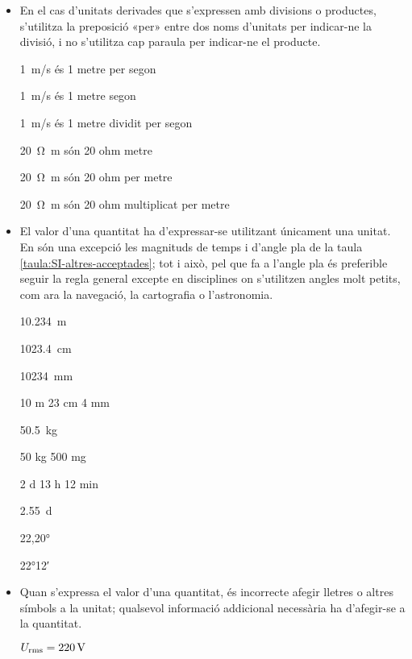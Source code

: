 \begin{itemize}
\item En el cas  d'unitats derivades que s'expressen amb divisions o
productes, s'utilitza la preposició «per» entre dos noms d'unitats
per indicar-ne la divisió, i no s'utilitza cap paraula per indicar-ne el
producte.

\textcolor{Green}\faCheckSquare{} \qty{1}{m/s} és 1 metre per segon

\textcolor{Red}\faTimesCircle{}  \qty{1}{m/s} és 1 metre segon

\textcolor{Red}\faTimesCircle{}  \qty{1}{m/s} és 1 metre dividit per segon

 \textcolor{Green}\faCheckSquare{} \qty{20}{\ohm.m} són 20 ohm metre

\textcolor{Red}\faTimesCircle{}   \qty{20}{\ohm.m} són 20 ohm  per metre

\textcolor{Red}\faTimesCircle{}   \qty{20}{\ohm.m} són 20 ohm multiplicat per metre


\item El valor d'una quantitat ha d'expressar-se  utilitzant únicament una unitat. En són una excepció les magnituds de temps i d'angle pla de la taula \vref{taula:SI-altres-acceptades}; tot i això, pel que fa a l'angle pla és preferible seguir la regla general excepte en disciplines on s'utilitzen angles molt petits, com ara la navegació, la cartografia o l'astronomia.

\textcolor{Green}\faCheckSquare{} \qty{10,234}{m}

\textcolor{Green}\faCheckSquare{} \qty{1023,4}{cm}

\textcolor{Green}\faCheckSquare{} \qty{10234}{mm}

\textcolor{Red}\faTimesCircle{}  10 m 23 cm 4 mm

\textcolor{Green}\faCheckSquare{} \qty{50,5}{kg}


\textcolor{Red}\faTimesCircle{}  50 kg 500 mg

\textcolor{Green}\faCheckSquare{} 2 d 13 h 12 min

\textcolor{Red}\faTimesCircle{}   \qty{2,55}{d}

\textcolor{Green}\faCheckSquare{} \ang{22,20}

\textcolor{Blue}\faExclamationTriangle{} \ang{22;12}

\item Quan s'expressa el valor d'una quantitat, és incorrecte afegir
lletres o altres símbols a la unitat; qualsevol informació
addicional necessària ha d'afegir-se a la quantitat.

\textcolor{Green}\faCheckSquare{} $U_\mathrm{rms} =\qty{220}{V}$


\end{itemize}
